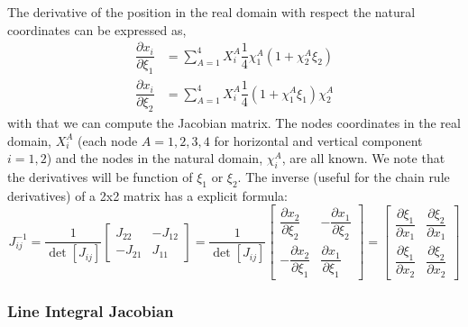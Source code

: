 \documentclass[11pt, a4paper]{article}
\numberwithin{equation}{section}
\begin{document}
The derivative of the position in the real domain with respect the natural coordinates can be expressed as,
\begin{align*}
\dfrac{\partial x_i}{\partial \xi_1} &= \sum_{A=1}^4 X_i^A \dfrac{1}{4} \chi_1^A \left( 1 + \chi_2^A \xi_2 \right) \\
\dfrac{\partial x_i}{\partial \xi_2} &= \sum_{A=1}^4 X_i^A \dfrac{1}{4} \left( 1 + \chi_1^A \xi_1 \right)  \chi_2^A 
\end{align*}
with that we can compute the Jacobian matrix. The nodes coordinates in the real domain, $X^A_i$ (each node $A=1,2,3,4$ for horizontal and vertical component $i=1,2$) and the nodes in the natural domain, $\chi_i^A$, are all known. We note that the derivatives will be function of $\xi_1$ or $\xi_2$. The inverse (useful for the chain rule derivatives) of a 2x2 matrix has a explicit formula:
\begin{equation}
J^{-1}_{ij} = \dfrac{1}{\det[J_{ij}]} \begin{bmatrix}
J_{22} & - J_{12} \\
 -J_{21} & J_{11}
\end{bmatrix} =
\dfrac{1}{\det[J_{ij}]}
\begin{bmatrix}
\dfrac{\partial x_2}{\partial \xi_2}  & -\dfrac{\partial x_1}{\partial \xi_2} \\[0.4cm]
-\dfrac{\partial x_2}{\partial \xi_1}  &  \dfrac{\partial x_1}{\partial \xi_1}
\end{bmatrix}
=
\begin{bmatrix}
\dfrac{\partial \xi_1}{\partial x_1} & \dfrac{\partial \xi_2}{\partial x_1}\\[0.4cm]
\dfrac{\partial \xi_1}{\partial x_2} & \dfrac{\partial \xi_2}{\partial x_2}
\end{bmatrix}
\end{equation}

\subsubsection{Line Integral Jacobian}
\end{document}
